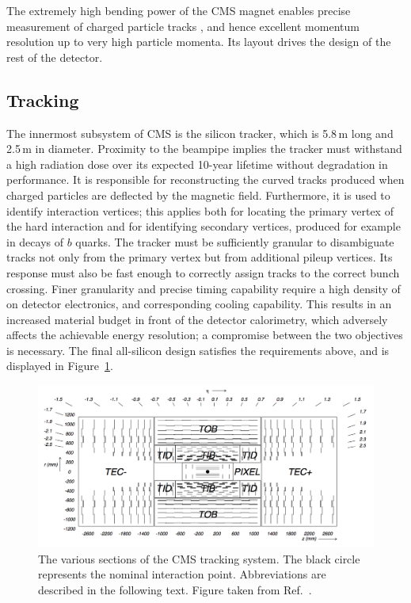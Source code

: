 The extremely high bending power of the CMS magnet enables precise measurement of charged particle tracks , 
and hence excellent momentum resolution up to very high particle momenta.
Its layout drives the design of the rest of the detector.

\subsection{Tracking}

The innermost subsystem of CMS is the silicon tracker, which is 5.8\,m long and 2.5\,m in diameter. 
Proximity to the beampipe implies the tracker must withstand a high radiation dose over its expected 10-year lifetime without degradation in performance.
It is responsible for reconstructing the curved tracks produced when charged particles are deflected by the magnetic field. %
Furthermore, it is used to identify interaction vertices; 
this applies both for locating the primary vertex of the hard interaction and for identifying secondary vertices, produced for example in decays of $b$ quarks.
The tracker must be sufficiently granular to disambiguate tracks not only from the primary vertex but from additional pileup vertices.
Its response must also be fast enough to correctly assign tracks to the correct bunch crossing.
Finer granularity and precise timing capability require a high density of on detector electronics, and corresponding cooling capability.
This results in an increased material budget in front of the detector calorimetry, which adversely affects the achievable energy resolution; 
a compromise between the two objectives is necessary.
The final all-silicon design satisfies the requirements above, and is displayed in Figure~\ref{fig:detector_tracker}.

\begin{figure}[h!]
  \centering
  \includegraphics[width=\textwidth]{Figures/Detector/TrackerUgly.png}
  \caption[The CMS tracker.]
  {The various sections of the CMS tracking system.
  The black circle represents the nominal interaction point.
  Abbreviations are described in the following text.
  Figure taken from Ref.~\cite{CMSdetector}.}
  \label{fig:detector_tracker}
\end{figure}


